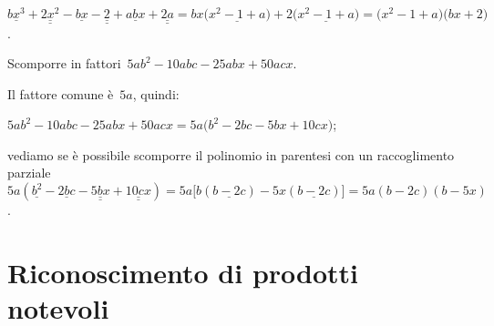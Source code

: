 \begin{exrig}
\begin{esempio}
\begin{enumeratea}

 \item $\underline{bx^{3}}+\underline{\underline {2x^{2}}}-\underline{bx}-\underline{\underline{2}}+\underline{abx}+\underline{\underline{2a}}
     =bx\bigl(\underline{x^{2}-1+a}\bigr)+2\bigl(\underline{x^{2}-1+a}\bigr)=\bigl(x^{2}-1+a\bigr)\bigl(bx+2\bigr)$.
 \end{enumeratea}
 \end{esempio}

 \begin{esempio}
Scomporre in fattori~$5ab^{2}-10abc-25abx+50acx$.
 \begin{enumeratea}
  \item Il fattore comune è~$5a$, quindi:
    \begin{itemize*}
    \item $5ab^{2}-10abc-25abx+50acx=5a\bigl(b^{2}-2bc-5bx+10cx\bigr)$;
    \end{itemize*}

 \item vediamo se è possibile scomporre il polinomio in parentesi con un raccoglimento parziale~$5a(\underline{b^{2}}-\underline{2bc}-\underline{\underline{5bx}}+\underline{\underline{10cx}})=5a\bigl[b(\underline{b-2c})-5x(\underline{b-2c})\bigr]=5a(b-2c)(b-5x)$.
 \end{enumeratea}
 \end{esempio}
\end{exrig}

\ovalbox{\risolvii \ref{ese:13.12}, \ref{ese:13.13}, \ref{ese:13.14}, \ref{ese:13.15}, \ref{ese:13.16}, \ref{ese:13.17}, \ref{ese:13.18}, \ref{ese:13.19}, \ref{ese:13.20},\ref{ese:13.21}, \ref{ese:13.22}}

\pagebreak
\section{Riconoscimento di prodotti notevoli}


